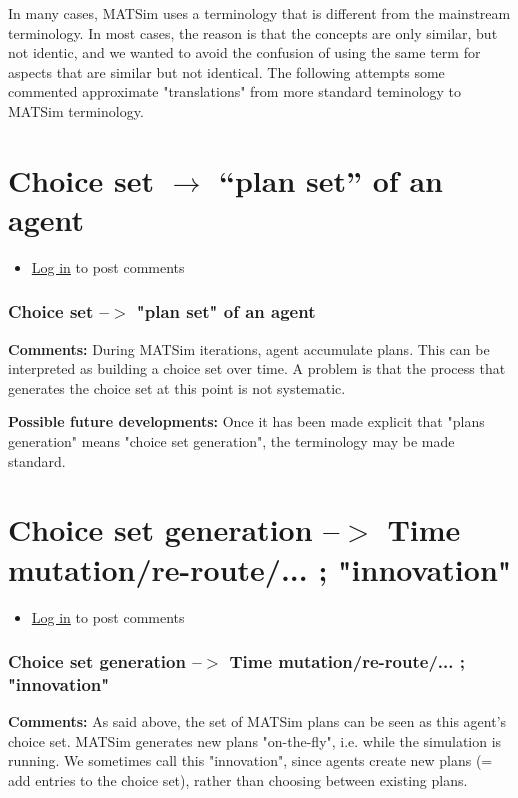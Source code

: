 \documentclass[a4paper,11pt]{report}
\begin{document}
In  many cases, MATSim uses a terminology that is different from the  mainstream terminology. In most cases, the reason is that the  concepts are only similar, but not identic, and we wanted to avoid the  confusion of using the same term for aspects that are similar but not  identical. The following attempts some commented approximate  "translations" from more standard teminology to MATSim terminology.

\vfill\eject
\section{Choice set $\to$ ``plan set'' of an agent}
\begin{itemize}
	\item \href{http://www.matsim.org/user/login?destination=comment/reply/539%23comment-form}{Log in} to post comments
\end{itemize}

\subsubsection{Choice set --$>$ "plan set" of an agent}

\textbf{Comments:} During MATSim iterations, agent accumulate   plans. This can be  interpreted as building a choice set over  time. A  problem is that the  process that generates the choice  set at this  point is not systematic.

\textbf{Possible future developments:} Once it has been made explicit that "plans generation" means "choice set generation", the terminology may be made standard.

\vfill\eject
\section{Choice set generation --$>$ Time mutation/re-route/... ; "innovation"}
\begin{itemize}
	\item \href{http://www.matsim.org/user/login?destination=comment/reply/540%23comment-form}{Log in} to post comments
\end{itemize}

\subsubsection{Choice set generation --$>$ Time mutation/re-route/... ; "innovation"}

\textbf{Comments:} As said above, the set of MATSim plans can   be seen as this agent's choice set. MATSim generates new plans   "on-the-fly", i.e. while the simulation is running. We sometimes  call  this "innovation", since agents create new plans (= add entries to  the  choice set), rather than choosing between existing plans.
\end{document}
